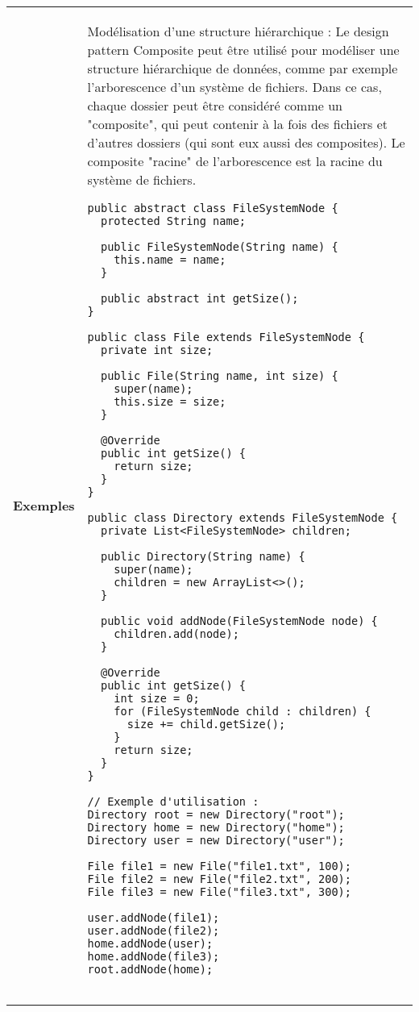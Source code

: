 \begin{table}[H]
\begin{adjustbox}{max width=\textwidth}
\begin{tabular}{l|p{\textwidth}}
\cmidrule(lr){1-2}
\multirow{2}{*}{\textbf{Exemples}} & 
\hspace{4mm}
\begin{minipage}[tl]{0.5\textwidth}
\begin{minipage}[t]{1\textwidth}
Modélisation d'une structure hiérarchique :
Le design pattern Composite peut être utilisé pour modéliser une structure hiérarchique de données, comme par exemple l'arborescence d'un système de fichiers. Dans ce cas, chaque dossier peut être considéré comme un "composite", qui peut contenir à la fois des fichiers et d'autres dossiers (qui sont eux aussi des composites). Le composite "racine" de l'arborescence est la racine du système de fichiers. 
\end{minipage}
\begin{minipage}[b]{1\textwidth}
\begin{lstlisting}[style=monstyle]
public abstract class FileSystemNode {
  protected String name;

  public FileSystemNode(String name) {
    this.name = name;
  }

  public abstract int getSize();
}

public class File extends FileSystemNode {
  private int size;

  public File(String name, int size) {
    super(name);
    this.size = size;
  }

  @Override
  public int getSize() {
    return size;
  }
}

public class Directory extends FileSystemNode {
  private List<FileSystemNode> children;

  public Directory(String name) {
    super(name);
    children = new ArrayList<>();
  }

  public void addNode(FileSystemNode node) {
    children.add(node);
  }

  @Override
  public int getSize() {
    int size = 0;
    for (FileSystemNode child : children) {
      size += child.getSize();
    }
    return size;
  }
}

// Exemple d'utilisation :
Directory root = new Directory("root");
Directory home = new Directory("home");
Directory user = new Directory("user");

File file1 = new File("file1.txt", 100);
File file2 = new File("file2.txt", 200);
File file3 = new File("file3.txt", 300);

user.addNode(file1);
user.addNode(file2);
home.addNode(user);
home.addNode(file3);
root.addNode(home);


\end{lstlisting}
\end{minipage}
\end{minipage}
\end{tabular}
\end{adjustbox}
\end{table}
